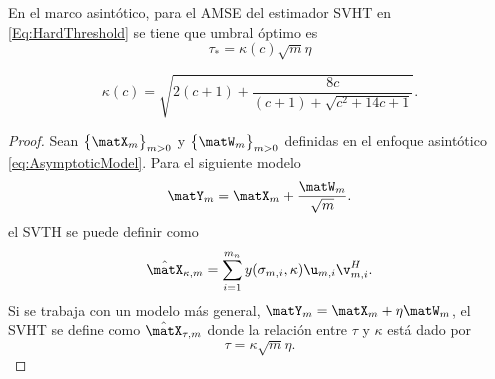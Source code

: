 	\begin{theorem}\cite[Teorema 4]{Gavish2014}\label{Theo:Gavish}
		En el marco asintótico, para el AMSE del estimador SVHT en \eqref{Eq:HardThreshold} se tiene que  umbral óptimo es
		\begin{equation}
	   	    \tau_* = \kappa(c)\sqrt{m}\eta
		      \label{Eq:ThresholdGavish}
		\end{equation}
				
		\begin{equation}
			\kappa(c) = %
			\sqrt{2(c+1)+\frac{8c}{(c+1)+\sqrt{c^2+14c+1}}}. 
		\end{equation}
	\end{theorem} 
    \begin{proof}
        Sean $\big\{\matX_m\big\}_{m>0}$ y $\big\{\matW_m\big\}_{m>0}$ definidas en el enfoque asintótico \eqref{eq:AsymptoticModel}. Para el siguiente modelo
        \[\matY_m = \matX_m + \frac{\matW_m}{\sqrt{m}}.\]
        el SVTH se puede definir como
        \begin{equation}
            \hat{\matX}_{\kappa,m} = \sum_{i=1}^{m_n}y(\sigma_{m,i},\kappa)\u_{m,i}\v^H_{m,i}.
            \label{Eq:SVHT_natural}
        \end{equation}
        Si se trabaja con un modelo más general, $\matY_m = \matX_m + \eta\matW_m$, el SVHT se define como $\hat{\matX}_{\tau,m}$ donde la relación entre $\tau$ y $\kappa$ está dado por \begin{equation}\tau = \kappa\sqrt{m}\eta.\label{eq:tau_kappa}\end{equation}


\end{proof}
